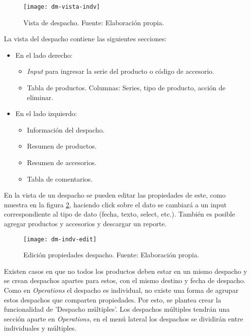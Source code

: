 \begin{figure}[H]
	\centering
	\texttt{[image: dm-vista-indv]}
	\caption{\label{fig:dm-vista-indv} Vista de despacho. Fuente: Elaboración propia.}
\end{figure}

La vista del despacho contiene las siguientes secciones:
\begin{itemize}
    \item En el lado derecho:
    \begin{itemize}
        \item \textit{Input} para ingresar la serie del producto o código de accesorio.
        \item Tabla de productos. Columnas: Series, tipo de producto, acción de eliminar.
    \end{itemize}
    \item En el lado izquierdo:
    \begin{itemize}
        \item Información del despacho.
        \item Resumen de productos.
        \item Resumen de accesorios.
        \item Tabla de comentarios.
    \end{itemize}
\end{itemize}

En la vista de un despacho se pueden editar las propiedades de este, como muestra en la figura \ref{fig:dm-indv-edit}, haciendo click sobre el dato se cambiará a un input correspondiente al tipo de dato (fecha, texto, select, etc.). También es posible agregar productos y accesorios y descargar un reporte.

\begin{figure}[H]
	\centering
	\texttt{[image: dm-indv-edit]}
	\caption{\label{fig:dm-indv-edit} Edición propiedades despacho. Fuente: Elaboración propia.}
\end{figure}
Existen casos en que no todos los productos deben estar en un mismo despacho y se crean despachos apartes para estos, con el mismo destino y fecha de despacho.
Como en \textit{Operations} el despacho es individual, no existe una forma de agrupar estos despachos que comparten propiedades. Por esto, se plantea crear la funcionalidad de 'Despacho múltiples'. 
Los despachos múltiples tendrán una sección aparte en \textit{Operations}, en el menú lateral los despachos se dividirán entre individuales y múltiples.

